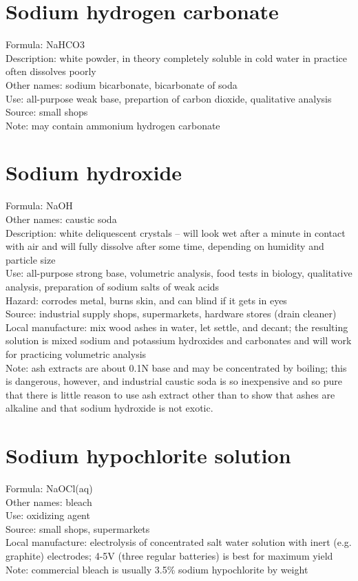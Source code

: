 \section{Sodium hydrogen carbonate}
Formula: NaHCO3\\
Description: white powder, 
in theory completely soluble in cold water 
in practice often dissolves poorly\\
Other names: sodium bicarbonate, 
bicarbonate of soda\\
Use: all-purpose weak base, 
prepartion of carbon dioxide, 
qualitative analysis\\
Source: small shops \\
Note: may contain ammonium hydrogen carbonate

\section{Sodium hydroxide}
Formula: NaOH\\
Other names: caustic soda\\
Description: white deliquescent crystals – 
will look wet after a minute in contact with air 
and will fully dissolve after some time, 
depending on humidity and particle size\\ 
Use: all-purpose strong base, 
volumetric analysis, 
food tests in biology, 
qualitative analysis, 
preparation of sodium salts of weak acids\\
Hazard: corrodes metal, 
burns skin, 
and can blind if it gets in eyes\\
Source: industrial supply shops, 
supermarkets, 
hardware stores (drain cleaner)\\
Local manufacture: mix wood ashes in water, 
let settle, 
and decant; 
the resulting solution is mixed sodium and potassium hydroxides 
and carbonates and will work for practicing volumetric analysis\\
Note: ash extracts are about 0.1N base and may be concentrated by boiling; 
this is dangerous, 
however, 
and industrial caustic soda is so inexpensive 
and so pure that there is little reason to use ash extract 
other than to show that ashes are alkaline 
and that sodium hydroxide is not exotic.

\section{Sodium hypochlorite solution}
Formula: NaOCl(aq)\\
Other names: bleach\\
Use: oxidizing agent\\
Source: small shops, 
supermarkets\\
Local manufacture: electrolysis of concentrated salt water solution 
with inert (e.g. 
graphite) electrodes; 
4-5V (three regular batteries) is best for maximum yield\\
Note: commercial bleach is usually 3.5\% sodium hypochlorite by weight

